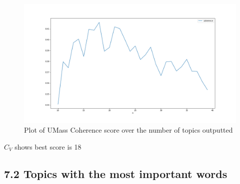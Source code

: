 \documentclass[
]{article}
\begin{document}
\begin{figure}

{\centering \includegraphics[width=1\linewidth]{images/Best_coherenceC_v} 

}

\caption{Plot of UMass Coherence score over the number of topics outputted}\label{fig:cohcv}
\end{figure}

\(C_V\) shows best score is 18

\hypertarget{topics-with-the-most-important-words}{%
\subsection{7.2 Topics with the most important
words}\label{topics-with-the-most-important-words}}
\end{document}
